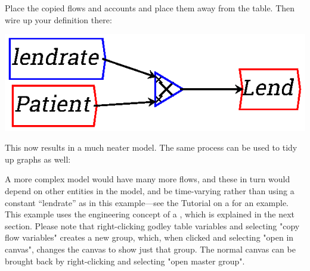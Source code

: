 \begin{center}
\end{center}

Place the copied flows and accounts and place them away from the
table. Then wire up your definition there:


\begin{center}
\includegraphics{images/NewItem154.eps}
\end{center}


This now results in a much neater model. The same process can be used
to tidy up graphs as well:

\begin{center}
\end{center}


A more complex model would have many more flows, and these in turn
would depend on other entities in the model, and be time-varying
rather than using a constant ``lendrate'' as in this example---see the
Tutorial on a  for an
example. This example uses the engineering concept of a
, which is explained in the
next section. Please note that right-clicking godley table variables and
selecting "copy flow variables" creates a new group, which, when clicked and
selecting "open in canvas", changes the canvas to show just that group. The normal
canvas can be brought back by right-clicking and selecting "open master group".


